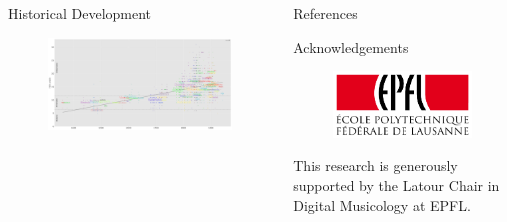 \documentclass[final]{beamer}
\begin{document}
\begin{frame}[t]
\begin{minipage}[t][.3\textheight][t]{\textwidth}
\begin{columns}
\begin{column}{.6\textwidth}
\begin{block}{Historical Development}
		    \begin{figure}
		      \centering
		      \includegraphics[width=\textwidth]{img/fifth_widths}
		    \end{figure}

		  \end{block}
		\end{column}

		\begin{column}{.3\textwidth}
			\begin{block}{References}
          \printbibliography
      \end{block}

      \begin{block}{Acknowledgements}

        \begin{figure}
          \includegraphics[width=.3\textwidth]{img/Logo_EPFL.pdf}
        \end{figure}

        \small
        This research is generously supported by the Latour Chair in Digital Musicology at EPFL.
      \end{block}
		\end{column}

\end{columns}
\end{minipage}

\end{frame} %
\end{document}
